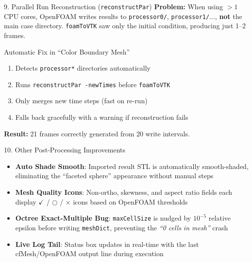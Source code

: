 \documentclass[dvipsnames,mathserif]{beamer}
\begin{document}
\begin{frame}{9. Parallel Run Reconstruction (\texttt{reconstructPar})}
    \textbf{Problem:} When using $>1$ CPU cores, OpenFOAM writes results to \texttt{processor0/}, \texttt{processor1/}..., \textbf{not} the main case directory. \texttt{foamToVTK} saw only the initial condition, producing just 1--2 frames.
    \vspace{0.2cm}
    \begin{block}{Automatic Fix in ``Color Boundary Mesh''}
        \begin{enumerate}
            \item Detects \texttt{processor*} directories automatically
            \item Runs \texttt{reconstructPar -newTimes} before \texttt{foamToVTK}
            \item Only merges new time steps (fast on re-run)
            \item Falls back gracefully with a warning if reconstruction fails
        \end{enumerate}
    \end{block}
    \textbf{Result:} 21 frames correctly generated from 20 write intervals.
\end{frame}

\begin{frame}{10. Other Post-Processing Improvements}
    \begin{itemize}
        \item \textbf{Auto Shade Smooth}: Imported result STL is automatically smooth-shaded, eliminating the ``faceted sphere'' appearance without manual steps
        \item \textbf{Mesh Quality Icons}: Non-ortho, skewness, and aspect ratio fields each display {\color{green}$\checkmark$} / {\color{orange}$\bigcirc$} / {\color{red}$\times$} icons based on OpenFOAM thresholds
        \item \textbf{Octree Exact-Multiple Bug}: \texttt{maxCellSize} is nudged by $10^{-5}$ relative epsilon before writing \texttt{meshDict}, preventing the \textit{``0 cells in mesh''} crash
        \item \textbf{Live Log Tail}: Status box updates in real-time with the last cfMesh/OpenFOAM output line during execution
    \end{itemize}
\end{frame}

\end{document}

